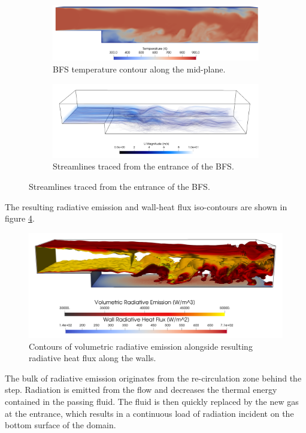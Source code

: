 \begin{figure}

\end{figure}
\begin{figure}
  \begin{subfigure}{1\textwidth}
  \includegraphics[width=\linewidth]{figures/ch4/BFS_temperature.png}
  \caption{BFS temperature contour along the mid-plane. }
  \label{fig:BFS_temperature}
  \end{subfigure}
  \begin{subfigure}{1\textwidth}
  \includegraphics[width=\linewidth]{figures/ch4/BFS_streamlines6.png}
  \caption{Streamlines traced from the entrance of the BFS.}
  \label{fig:BFS_streamlines}
  \end{subfigure}
  \label{fig:BFS_contours}
\end{figure}
The resulting radiative emission and wall-heat flux iso-contours are shown in figure \ref{fig:BFS_radiationcontours}.
\begin{figure}
\includegraphics[width=\linewidth]{figures/ch4/BFS_volwallflux3.png}
\caption{Contours of volumetric radiative emission alongside resulting radiative heat flux along the walls.}
\label{fig:BFS_radiationcontours}
\end{figure}
The bulk of radiative emission originates from the re-circulation zone behind the step. Radiation is emitted from the flow and decreases the thermal energy contained in the passing fluid. 
The fluid is then quickly replaced by the new gas at the entrance, which results in a continuous load of radiation incident on the bottom surface of the domain. 

